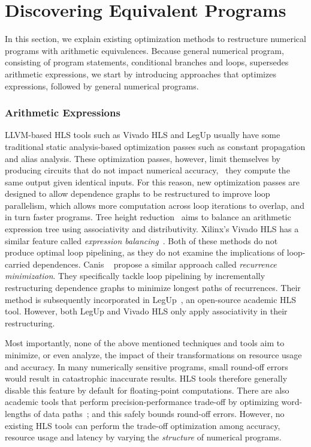 \section{Discovering Equivalent Programs}
\label{bg:sec:discovering_equivalent_programs}

In this section, we explain existing optimization methods to restructure
numerical programs with arithmetic equivalences.  Because general numerical
program, consisting of program statements, conditional branches and loops,
supersedes arithmetic expressions, we start by introducing approaches that
optimizes expressions, followed by general numerical programs.


\subsubsection{Arithmetic Expressions}
\label{bg:ssub:arithmetic_expressions}

LLVM-based HLS tools such as Vivado HLS and LegUp usually have some
traditional static analysis-based optimization passes such as constant
propagation and alias analysis.  These optimization passes, however, limit
themselves by producing circuits that do not impact numerical accuracy,
\ie~they compute the same output given identical inputs.  For this reason,
new optimization passes are designed to allow dependence graphs to be
restructured to improve loop parallelism, which allows more computation
across loop iterations to overlap, and in turn faster programs.  Tree height
reduction~\cite{nicolau91} aims to balance an arithmetic expression tree using
associativity and distributivity.  Xilinx's Vivado HLS has a similar feature
called \emph{expression balancing}~\cite{vivado_hls}.  Both of these methods do
not produce optimal loop pipelining, as they do not examine the implications
of loop-carried dependences.  Canis \etal~\cite{canis14} propose a similar
approach called \emph{recurrence minimization}. They specifically tackle
loop pipelining by incrementally restructuring dependence graphs to minimize
longest paths of recurrences.  Their method is subsequently incorporated in
LegUp~\cite{legup}, an open-source academic HLS tool.  However, both LegUp and
Vivado HLS only apply associativity in their restructuring.

Most importantly, none of the above mentioned techniques and tools aim to
minimize, or even analyze, the impact of their transformations on resource
usage and accuracy. In many numerically sensitive programs, small round-off
errors would result in catastrophic inaccurate results.  HLS tools therefore
generally disable this feature by default for floating-point computations.
There are also academic tools that perform precision-performance trade-off by
optimizing word-lengths of data paths~\cite{constantinides}; and this safely
bounds round-off errors.  However, no existing HLS tools can perform the
trade-off optimization among accuracy, resource usage and latency by varying
the \emph{structure} of numerical programs.

